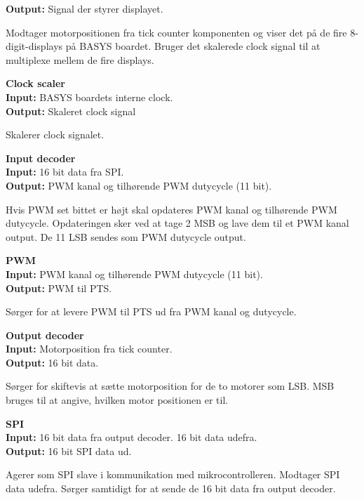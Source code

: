 \textbf{Output:} Signal der styrer displayet.

Modtager motorpositionen fra tick counter komponenten og viser det på de fire 8-digit-displays 
på BASYS boardet. Bruger det skalerede clock signal til at multiplexe mellem de 
fire displays.

\textbf{Clock scaler}\\
\textbf{Input:} BASYS boardets interne clock.\\
\textbf{Output:} Skaleret clock signal

Skalerer clock signalet.

\textbf{Input decoder}\\
\textbf{Input:} 16 bit data fra SPI.\\
\textbf{Output:} PWM kanal og tilhørende PWM dutycycle (11 bit).

Hvis PWM set bittet er højt skal opdateres PWM kanal og tilhørende PWM dutycycle.
Opdateringen sker ved at tage 2 MSB og lave dem til et PWM kanal output. De 11 
LSB sendes som PWM dutycycle output.

\textbf{PWM}\\
\textbf{Input:} PWM kanal og tilhørende PWM dutycycle (11 bit).\\
\textbf{Output:} PWM til PTS.

Sørger for at levere PWM til PTS ud fra PWM kanal og dutycycle.

\textbf{Output decoder}\\
\textbf{Input:} Motorposition fra tick counter.\\
\textbf{Output:} 16 bit data.

Sørger for skiftevis at sætte motorposition for de to motorer som LSB.
MSB bruges til at angive, hvilken motor positionen er til.

\textbf{SPI}\\
\textbf{Input:} 16 bit data fra output decoder. 16 bit data udefra.\\
\textbf{Output:} 16 bit SPI data ud.

Agerer som SPI slave i kommunikation med mikrocontrolleren.
Modtager SPI data udefra. Sørger samtidigt for at sende de 16 bit data fra output decoder.


